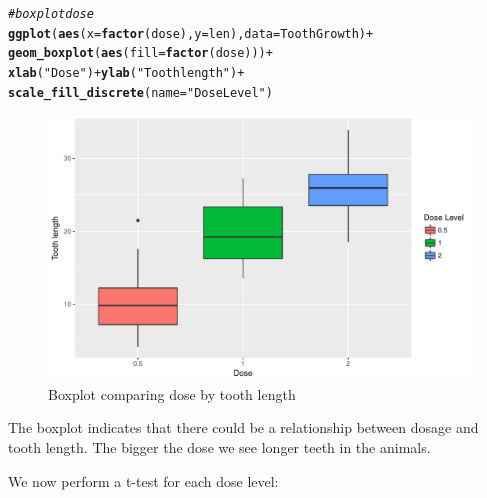 \documentclass{article}\usepackage[]{graphicx}\usepackage[]{color}
\makeatletter
\def\maxwidth{ %
  \ifdim\Gin@nat@width>\linewidth
    \linewidth
  \else
    \Gin@nat@width
  \fi
}
\newcommand{\hlstr}[1]{\textcolor[rgb]{0.192,0.494,0.8}{#1}}%
\newcommand{\hlcom}[1]{\textcolor[rgb]{0.678,0.584,0.686}{\textit{#1}}}%
\newcommand{\hlopt}[1]{\textcolor[rgb]{0,0,0}{#1}}%
\newcommand{\hlstd}[1]{\textcolor[rgb]{0.345,0.345,0.345}{#1}}%
\newcommand{\hlkwc}[1]{\textcolor[rgb]{0.333,0.667,0.333}{#1}}%
\newcommand{\hlkwd}[1]{\textcolor[rgb]{0.737,0.353,0.396}{\textbf{#1}}}%
\newenvironment{kframe}{%
 \def\at@end@of@kframe{}%
 \ifinner\ifhmode%
  \def\at@end@of@kframe{\end{minipage}}%
  \begin{minipage}{\columnwidth}%
 \fi\fi%
 \def\FrameCommand##1{\hskip\@totalleftmargin \hskip-\fboxsep
 \colorbox{shadecolor}{##1}\hskip-\fboxsep
     \hskip-\linewidth \hskip-\@totalleftmargin \hskip\columnwidth}%
 \MakeFramed {\advance\hsize-\width
   \@totalleftmargin\z@ \linewidth\hsize
   \@setminipage}}%
 {\par\unskip\endMakeFramed%
 \at@end@of@kframe}
\newenvironment{knitrout}{}{} %
\makeatother
\begin{document}
\begin{knitrout}
\color{fgcolor}\begin{kframe}
\begin{alltt}
\hlcom{# boxplot dose}
\hlkwd{ggplot}\hlstd{(}\hlkwd{aes}\hlstd{(}\hlkwc{x}\hlstd{=}\hlkwd{factor}\hlstd{(dose),} \hlkwc{y}\hlstd{=len),} \hlkwc{data}\hlstd{=ToothGrowth)} \hlopt{+}
  \hlkwd{geom_boxplot}\hlstd{(}\hlkwd{aes}\hlstd{(}\hlkwc{fill}\hlstd{=}\hlkwd{factor}\hlstd{(dose)))}\hlopt{+}
        \hlkwd{xlab}\hlstd{(}\hlstr{"Dose"}\hlstd{)} \hlopt{+}\hlkwd{ylab}\hlstd{(}\hlstr{"Tooth length"}\hlstd{)} \hlopt{+}
  \hlkwd{scale_fill_discrete}\hlstd{(}\hlkwc{name}\hlstd{=}\hlstr{"Dose Level"}\hlstd{)}
\end{alltt}
\end{kframe}\begin{figure}[h]
\includegraphics[width=\maxwidth,]{figure/boxplot1-1} \caption[Boxplot comparing dose by tooth length]{Boxplot comparing dose by tooth length}\label{fig:boxplot1}
\end{figure}


\end{knitrout}

The boxplot indicates that there could be a relationship between dosage and tooth length. The bigger the dose we see longer teeth in the animals.

We now perform a t-test for each dose level:
\end{document}
